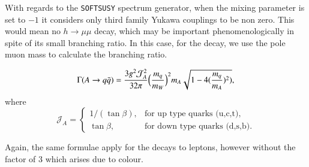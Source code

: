 \documentclass[final,3p,times]{elsarticle}
\begin{document}
With regards to the {\tt SOFTSUSY} spectrum generator, when the mixing parameter is set to $-1$ it considers
only third family Yukawa couplings to be non zero. This would mean no $h \rightarrow \mu \mu$ decay, which may be important phenomenologically in spite of its small branching ratio. In this case, for
the decay, we use the pole muon mass to calculate the branching ratio. 

\begin{equation}\label{Aqq}
\Gamma (A \rightarrow q \bar{q}) = {3 g^2 \mathcal{J}_A^2 \over 32\pi} \Big({m_q \over m_W}\Big)^2 m_A \sqrt{1 - 4 ({m_q \over m_A})^2)},
\end{equation} 
where
\begin{equation}
\mathcal{J}_A=\begin{cases}
    1 /(\tan \beta), & \text{for up type quarks (u,c,t)},\\
    \tan \beta, & \text{for down type quarks (d,s,b)}.
  \end{cases}
\end{equation}

Again, the same formulae apply for the decays to leptons, however without the factor of 3 which arises due to colour.
\end{document}
